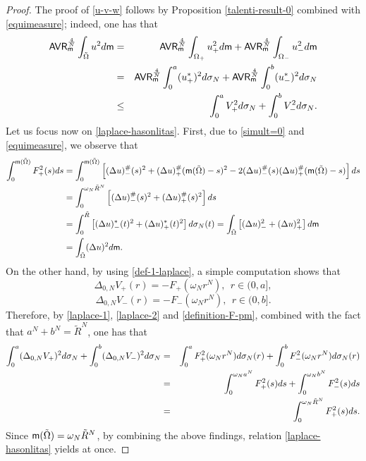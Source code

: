 \documentclass[10pt,a4paper]{amsart}
\begin{document}
		\begin{proof}
			The proof of 	\eqref{u-v-w} follows by Proposition \ref{talenti-result-0} combined with \eqref{equimeasure}; indeed, one has that 
			\begin{eqnarray*}
				{\sf AVR}_ {\sf m}^\frac{4}{N}	\int_{\tilde \Omega}u^2 {\rm d}{\sf m}&=&{\sf AVR}_ {\sf m}^\frac{4}{N}	\int_{\Omega_+}u_+^2 {\rm d}{\sf m}+{\sf AVR}_ {\sf m}^\frac{4}{N}	\int_{ \Omega_-}u_-^2 {\rm d}{\sf m}\\&=&{\sf AVR}_ {\sf m}^\frac{4}{N}	\int_{0}^a (u_+^*)^2 {\rm d}\sigma_N+{\sf AVR}_ {\sf m}^\frac{4}{N}	\int_{ 0}^b(u_-^*)^2 {\rm d}\sigma_N\\&\leq&\int_{0}^aV_+^2 {\rm d}\sigma_N+\int_{0}^b V_-^2 {\rm d}\sigma_N.
			\end{eqnarray*}
			Let us focus now on \eqref{laplace-hasonlitas}. First, due to \eqref{simult=0} and \eqref{equimeasure}, we observe that
			\begin{align*}
				\int_{0}^{{\sf m}(\tilde \Omega)} F^2_+(s){\rm d}s
				&=\int_{0}^{{\sf m}(\tilde \Omega)} \left[(\Delta u)^\#_-(s)^2+(\Delta u)^\#_+({\sf m}(\tilde \Omega)-s)^2-2(\Delta u)^\#_-(s)(\Delta u)^\#_+({\sf m}(\tilde \Omega)-s)\right]{\rm d}s
				\\
				&=\int_{0}^{\omega_N \tilde R^N} \left[(\Delta u)^\#_-(s)^2+(\Delta u)^\#_+(s)^2\right]{\rm d}s\\&=\int_{0}^{\tilde R} \left[(\Delta u)^*_-(t)^2+(\Delta u)^*_+(t)^2\right]{\rm d}\sigma_N(t)	=\int_{\tilde \Omega} \left[(\Delta u)_-^2+(\Delta u)^2_+\right]{\rm d}{\sf m}
				\\&=\int_{\tilde \Omega} (\Delta u)^2{\rm d}{\sf m}.
			\end{align*}
			On the other hand, by using \eqref{def-1-laplace}, 
			a simple computation shows that
			\begin{equation}\label{laplace-1}
				\Delta_{0,N} V_+(r)=-F_+(\omega_N r^N),\ \ r\in (0,a],
			\end{equation}
			\begin{equation}\label{laplace-2}
				\Delta_{0,N} V_-(r)=-F_-(\omega_N r^N),\ \ r\in (0,b].
			\end{equation}
			Therefore, by \eqref{laplace-1},  \eqref{laplace-2} and  \eqref{definition-F-pm}, combined with the fact that $a^N+b^N=\tilde R^N$, one has that
			\begin{eqnarray*}
				\int_{0}^a (\Delta_{0,N}V_+)^2{\rm d}\sigma_N+ \int_{0}^b (\Delta_{0,N}V_-)^2{\rm d}\sigma_N&=&\int_{0}^a F_+^2(\omega_N r^N){\rm d}\sigma_N(r)+ \int_{0}^b F^2_-(\omega_N r^N){\rm d}\sigma_N(r)\\&=& \int_{0}^{\omega_N a^N} F_+^2(s){\rm d}s+ \int_{0}^{\omega_N b^N} F_-^2(s){\rm d}s\\&=&\int_{0}^{\omega_N \tilde R^N} F_+^2(s){\rm d}s.
			\end{eqnarray*}
			Since ${\sf m}(\tilde \Omega)=\omega_N \tilde R^N$, by combining the above findings, relation  \eqref{laplace-hasonlitas} yields at once. 
		\end{proof}
\end{document}

